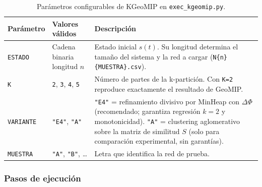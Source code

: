 \begin{table}[H]
\centering
\begin{tabular}{|l|l|p{7cm}|}
\hline
\textbf{Parámetro} & \textbf{Valores válidos} & \textbf{Descripción} \\
\hline
\texttt{ESTADO} & Cadena binaria longitud $n$ &
  Estado inicial $s(t)$. Su longitud determina el tamaño del sistema y
  la red a cargar (\texttt{N\{n\}\{MUESTRA\}.csv}). \\
\texttt{K} & \texttt{2}, \texttt{3}, \texttt{4}, \texttt{5} &
  Número de partes de la k-partición. Con \texttt{K=2} reproduce
  exactamente el resultado de GeoMIP. \\
\texttt{VARIANTE} & \texttt{"E4"}, \texttt{"A"} &
  \texttt{"E4"} = refinamiento divisivo por MinHeap con $\Delta\Phi$
  (recomendado; garantiza regresión $k=2$ y monotonicidad). \newline
  \texttt{"A"} = clustering aglomerativo sobre la matriz de similitud $S$
  (solo para comparación experimental, sin garantías). \\
\texttt{MUESTRA} & \texttt{"A"}, \texttt{"B"}, \ldots &
  Letra que identifica la red de prueba. \\
\hline
\end{tabular}
\caption{Parámetros configurables de KGeoMIP en \texttt{exec\_kgeomip.py}.}
\label{tab:params_kgeomip}
\end{table}

\subsubsection{Pasos de ejecución}

